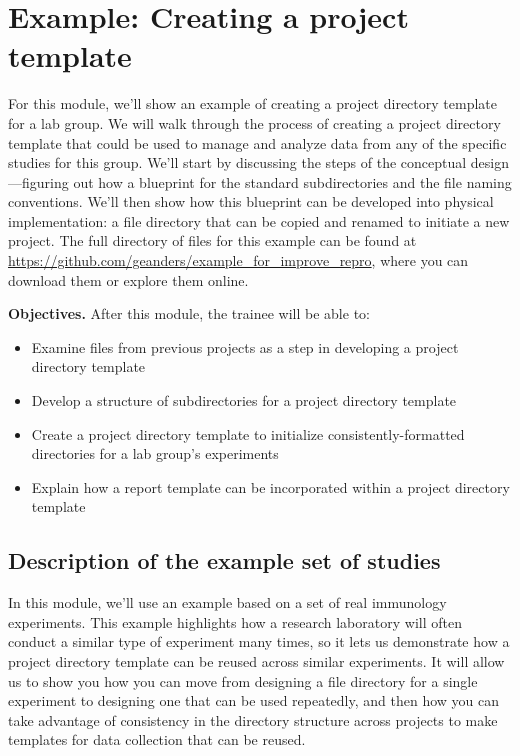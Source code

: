 \documentclass[]{tufte-book}
\providecommand{\tightlist}{%
  \setlength{\itemsep}{0pt}\setlength{\parskip}{0pt}}
\begin{document}
\section{Example: Creating a project template}\label{module8}

For this module, we'll show an example of creating a project directory template
for a lab group. We will walk through the process of creating a project
directory template that could be used to manage and analyze data from any of the
specific studies for this group. We'll start by discussing the steps of the
conceptual design---figuring out how a blueprint for the standard subdirectories
and the file naming conventions. We'll then show how this blueprint can be
developed into physical implementation: a file directory that can be copied and
renamed to initiate a new project. The full directory of files for this example
can be found at \url{https://github.com/geanders/example_for_improve_repro}, where you
can download them or explore them online.

\textbf{Objectives.} After this module, the trainee will be able to:

\begin{itemize}
\tightlist
\item
  Examine files from previous projects as a step in developing a project
  directory template
\item
  Develop a structure of subdirectories for a project directory template
\item
  Create a project directory template to initialize consistently-formatted
  directories for a lab group's experiments
\item
  Explain how a report template can be incorporated within a project directory
  template
\end{itemize}

\subsection{Description of the example set of studies}\label{description-of-the-example-set-of-studies}

In this module, we'll use an example based on a set of real immunology
experiments. This example highlights how a research laboratory will often
conduct a similar type of experiment many times, so it lets us demonstrate how a
project directory template can be reused across similar experiments. It will
allow us to show you how you can move from designing a file directory for a
single experiment to designing one that can be used repeatedly, and then how you
can take advantage of consistency in the directory structure across projects to
make templates for data collection that can be reused.
\end{document}
